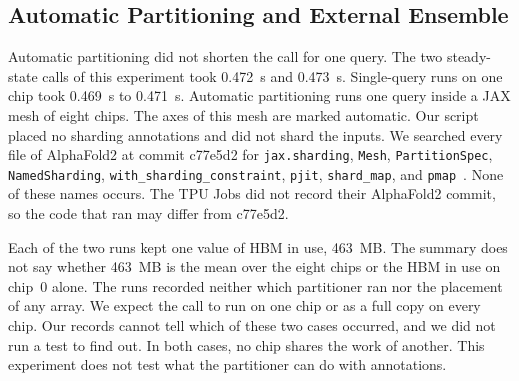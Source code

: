 \subsection{Automatic Partitioning and External Ensemble}\label{sec:res-auto}
Automatic partitioning did not shorten the call for one query.
The two steady-state calls of this experiment took 0.472~s and 0.473~s. Single-query runs on one chip took 0.469~s to 0.471~s. %
Automatic partitioning runs one query inside a JAX mesh of eight chips. The axes of this mesh are marked automatic.
Our script placed no sharding annotations and did not shard the inputs.
We searched every file of AlphaFold2 at commit c77e5d2 for \texttt{jax.sharding}, \texttt{Mesh}, \texttt{PartitionSpec}, \texttt{NamedSharding}, \texttt{with\_sharding\_\allowbreak constraint}, \texttt{pjit}, \texttt{shard\_map}, and \texttt{pmap}~\cite{alphafoldrepo}. %
None of these names occurs. The TPU Jobs did not record their AlphaFold2 commit, so the code that ran may differ from
c77e5d2.

 Each of the two runs kept one value of HBM in use, 463~MB. %
The summary does not say whether 463~MB is the mean over the eight chips or the HBM in use on chip~0 alone. %
The runs recorded neither which partitioner ran nor the placement of any array. We expect the call to run on one chip or
as a full copy on every chip. Our records cannot tell which of these two cases occurred, and we did not run a test to
find out. In both cases, no chip shares the work of another. This experiment does not test what the partitioner can do
with annotations.

